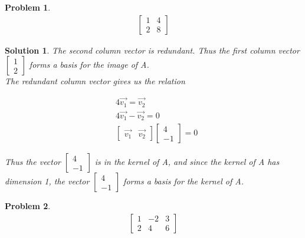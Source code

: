 \documentclass{article}
\newtheorem{problem}{Problem}
\newtheorem*{solution}{Solution}
\begin{document}
\begin{problem}
\begin{align*}
\begin{bmatrix}
1 & 4 \\ 2 & 8
\end{bmatrix}
\end{align*}
\end{problem}

\begin{solution}
The second column vector is redundant. Thus the first column vector $\begin{bmatrix}1 \\ 2 \end{bmatrix}$ forms a basis for the image of A. \\

The redundant column vector gives us the relation 

\begin{align*}
& 4\vec{v_{1}} = \vec{v_{2}} \\
& 4\vec{v_{1}} - \vec{v_{2}} = 0 \\
& \begin{bmatrix} \vec{v_{1}} & \vec{v_{2}} \end{bmatrix} \begin{bmatrix} 4 \\ -1 \end{bmatrix} = 0
\end{align*}

Thus the vector $\begin{bmatrix} 4 \\ -1 \end{bmatrix}$ is in the kernel of A, and since the kernel of A has dimension 1, the vector $\begin{bmatrix} 4 \\ -1 \end{bmatrix}$ forms a basis for the kernel of A.
\end{solution}

\begin{problem}
\begin{align*}
\begin{bmatrix}
1 & -2 & 3 \\ 2 & 4 & 6
\end{bmatrix}
\end{align*}
\end{problem}
\end{document}
